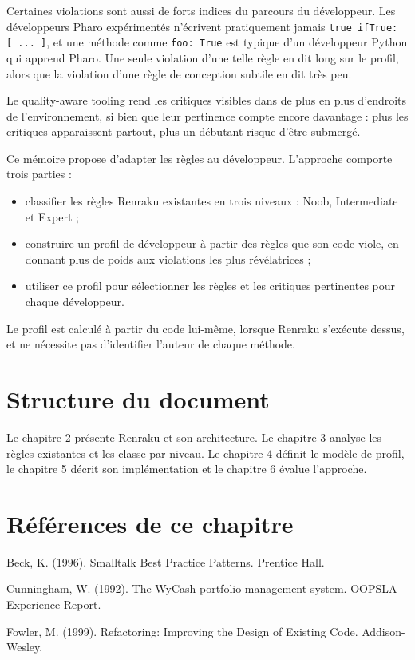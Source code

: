 \documentclass[11pt,a4paper]{report}
\begin{document}
Certaines violations sont aussi de forts indices du parcours du développeur. Les développeurs Pharo expérimentés n’écrivent pratiquement jamais \lstinline|true ifTrue: [ ... ]|, et une méthode comme \lstinline|foo: True| est typique d’un développeur Python qui apprend Pharo. Une seule violation d’une telle règle en dit long sur le profil, alors que la violation d’une règle de conception subtile en dit très peu.

Le quality-aware tooling rend les critiques visibles dans de plus en plus d’endroits de l’environnement, si bien que leur pertinence compte encore davantage : plus les critiques apparaissent partout, plus un débutant risque d’être submergé.

Ce mémoire propose d’adapter les règles au développeur. L’approche comporte trois parties :

\begin{itemize}
  \item classifier les règles Renraku existantes en trois niveaux : Noob, Intermediate et Expert ;
  \item construire un profil de développeur à partir des règles que son code viole, en donnant plus de poids aux violations les plus révélatrices ;
  \item utiliser ce profil pour sélectionner les règles et les critiques pertinentes pour chaque développeur.
\end{itemize}

Le profil est calculé à partir du code lui-même, lorsque Renraku s’exécute dessus, et ne nécessite pas d’identifier l’auteur de chaque méthode.

\section{Structure du document}
Le chapitre 2 présente Renraku et son architecture. Le chapitre 3 analyse les règles existantes et les classe par niveau. Le chapitre 4 définit le modèle de profil, le chapitre 5 décrit son implémentation et le chapitre 6 évalue l’approche.

\section*{Références de ce chapitre}
Beck, K. (1996). Smalltalk Best Practice Patterns. Prentice Hall.

Cunningham, W. (1992). The WyCash portfolio management system. OOPSLA Experience Report.

Fowler, M. (1999). Refactoring: Improving the Design of Existing Code. Addison-Wesley.
\end{document}
